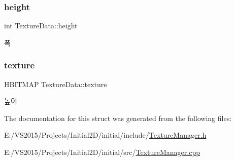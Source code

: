 \subsubsection{\texorpdfstring{height}{height}}
{\footnotesize\ttfamily int Texture\+Data\+::height}

폭 \mbox{\label{struct_texture_data_a7e2fd3fd9d3c2e06a0f29229f486f972}} 
\subsubsection{\texorpdfstring{texture}{texture}}
{\footnotesize\ttfamily H\+B\+I\+T\+M\+AP Texture\+Data\+::texture}

높이 

The documentation for this struct was generated from the following files\+:\begin{DoxyCompactItemize}
\item 
E\+:/\+V\+S2015/\+Projects/\+Initial2\+D/initial/include/\mbox{\hyperlink{_texture_manager_8h}{Texture\+Manager.\+h}}\item 
E\+:/\+V\+S2015/\+Projects/\+Initial2\+D/initial/src/\mbox{\hyperlink{_texture_manager_8cpp}{Texture\+Manager.\+cpp}}\end{DoxyCompactItemize}
